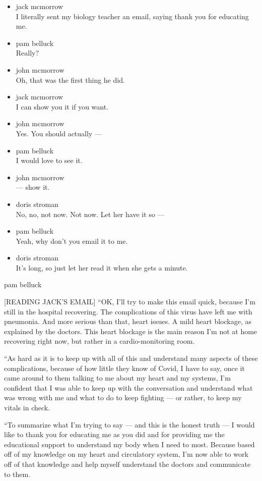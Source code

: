 \begin{itemize}
\item
  jack mcmorrow\\
  I literally sent my biology teacher an email, saying thank you for
  educating me.
\item
  pam belluck\\
  Really?
\item
  john mcmorrow\\
  Oh, that was the first thing he did.
\item
  jack mcmorrow\\
  I can show you it if you want.
\item
  john mcmorrow\\
  Yes. You should actually ---
\item
  pam belluck\\
  I would love to see it.
\item
  john mcmorrow\\
  --- show it.
\item
  doris stroman\\
  No, no, not now. Not now. Let her have it so ---
\item
  pam belluck\\
  Yeah, why don't you email it to me.
\item
  doris stroman\\
  It's long, so just let her read it when she gets a minute.
\end{itemize}

pam belluck

{[}READING JACK'S EMAIL{]} ``OK, I'll try to make this email quick,
because I'm still in the hospital recovering. The complications of this
virus have left me with pneumonia. And more serious than that, heart
issues. A mild heart blockage, as explained by the doctors. This heart
blockage is the main reason I'm not at home recovering right now, but
rather in a cardio-monitoring room.

``As hard as it is to keep up with all of this and understand many
aspects of these complications, because of how little they know of
Covid, I have to say, once it came around to them talking to me about my
heart and my systems, I'm confident that I was able to keep up with the
conversation and understand what was wrong with me and what to do to
keep fighting --- or rather, to keep my vitals in check.

``To summarize what I'm trying to say --- and this is the honest truth
--- I would like to thank you for educating me as you did and for
providing me the educational support to understand my body when I need
to most. Because based off of my knowledge on my heart and circulatory
system, I'm now able to work off of that knowledge and help myself
understand the doctors and communicate to them.

